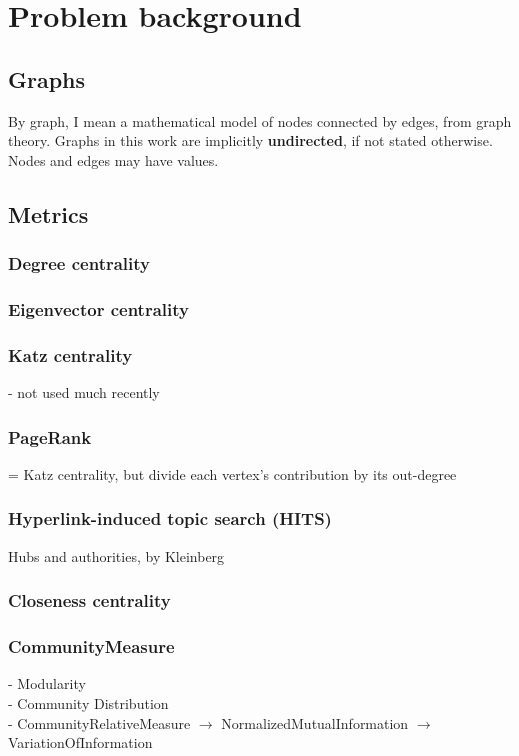 \section{Problem background}

\subsection{Graphs}

By graph, I mean a mathematical model of nodes connected by edges, from graph theory.
Graphs in this work are implicitly \textbf{undirected}, if not stated otherwise.
Nodes and edges may have values.

\subsection{Metrics}

\subsubsection{Degree centrality}

\subsubsection{Eigenvector centrality}

\subsubsection{Katz centrality}
- not used much recently

\subsubsection{PageRank}
= Katz centrality, but divide each vertex's contribution by its out-degree

\subsubsection{Hyperlink-induced topic search (HITS)}
Hubs and authorities, by Kleinberg

\subsubsection{Closeness centrality}


\subsubsection{CommunityMeasure}
- Modularity\\
- Community Distribution\\
- CommunityRelativeMeasure $\rightarrow$ NormalizedMutualInformation $\rightarrow$ VariationOfInformation

